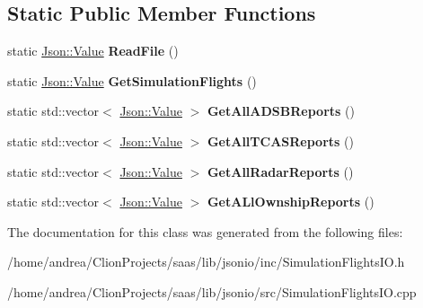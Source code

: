 \subsection*{Static Public Member Functions}
\begin{DoxyCompactItemize}
\item 
static \hyperlink{class_json_1_1_value}{Json\+::\+Value} {\bfseries Read\+File} ()\hypertarget{class_simulation_flights_i_o_a4403f368173eeaf850e4d161e00d064f}{}\label{class_simulation_flights_i_o_a4403f368173eeaf850e4d161e00d064f}

\item 
static \hyperlink{class_json_1_1_value}{Json\+::\+Value} {\bfseries Get\+Simulation\+Flights} ()\hypertarget{class_simulation_flights_i_o_a0fecd6176618527ce882c1bd705cea2e}{}\label{class_simulation_flights_i_o_a0fecd6176618527ce882c1bd705cea2e}

\item 
static std\+::vector$<$ \hyperlink{class_json_1_1_value}{Json\+::\+Value} $>$ {\bfseries Get\+All\+A\+D\+S\+B\+Reports} ()\hypertarget{class_simulation_flights_i_o_ab80deb0dbd2eff210c5a24211fbb0319}{}\label{class_simulation_flights_i_o_ab80deb0dbd2eff210c5a24211fbb0319}

\item 
static std\+::vector$<$ \hyperlink{class_json_1_1_value}{Json\+::\+Value} $>$ {\bfseries Get\+All\+T\+C\+A\+S\+Reports} ()\hypertarget{class_simulation_flights_i_o_ac54cf3a5ddcda61e56fbf523cfe7c541}{}\label{class_simulation_flights_i_o_ac54cf3a5ddcda61e56fbf523cfe7c541}

\item 
static std\+::vector$<$ \hyperlink{class_json_1_1_value}{Json\+::\+Value} $>$ {\bfseries Get\+All\+Radar\+Reports} ()\hypertarget{class_simulation_flights_i_o_aec11fa10f5610c6505c0ffe8c59ded5b}{}\label{class_simulation_flights_i_o_aec11fa10f5610c6505c0ffe8c59ded5b}

\item 
static std\+::vector$<$ \hyperlink{class_json_1_1_value}{Json\+::\+Value} $>$ {\bfseries Get\+A\+Ll\+Ownship\+Reports} ()\hypertarget{class_simulation_flights_i_o_a047aa637503e4988f9b9c0da284a601b}{}\label{class_simulation_flights_i_o_a047aa637503e4988f9b9c0da284a601b}

\end{DoxyCompactItemize}


The documentation for this class was generated from the following files\+:\begin{DoxyCompactItemize}
\item 
/home/andrea/\+Clion\+Projects/saas/lib/jsonio/inc/Simulation\+Flights\+I\+O.\+h\item 
/home/andrea/\+Clion\+Projects/saas/lib/jsonio/src/Simulation\+Flights\+I\+O.\+cpp\end{DoxyCompactItemize}
